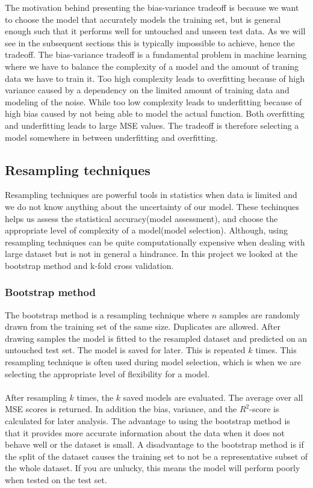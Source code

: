\documentclass[a4paper,twocolumn]{article}
\begin{document}
The motivation behind presenting the bias-variance tradeoff is because we want to choose the model that accurately models the training set, but is general enough such that it performs well for untouched and unseen test data. As we will see in the subsequent sections this is typically impossible to achieve, hence the tradeoff. The bias-variance tradeoff is a fundamental problem in machine learning where we have to balance the complexity of a model and the amount of traning data we have to train it. Too high complexity leads to overfitting because of high variance caused by a dependency on the limited amount of training data and modeling of the noise. While too low complexity leads to underfitting because of high bias caused by not being able to model the actual function. Both overfitting and underfitting leads to large MSE values. The tradeoff is therefore selecting a model somewhere in between underfitting and overfitting.
\subsection{Resampling techniques}
Resampling techniques are powerful tools in statistics when data is limited and we do not know anything about the uncertainty of our model. These techinques helps us assess the statistical accuracy(model assessment), and choose the appropriate level of complexity of a model(model selection). Although, using resampling techniques can be quite computationally expensive when dealing with large dataset but is not in general a hindrance. In this project we looked at the bootstrap method and k-fold cross validation.
\subsubsection{Bootstrap method}
The bootstrap method is a resampling technique where $n$ samples are randomly drawn from the training set of the same size. Duplicates are allowed. After drawing samples the model is fitted to the resampled dataset and predicted on an untouched test set. The model is saved for later. This is repeated $k$ times. This resampling technique is often used during model selection, which is when we are selecting the appropriate level of flexibility for a model.\\
\\
After resampling $k$ times, the $k$ saved models are evaluated. The average over all MSE scores is returned. In addition the bias, variance, and the $R^{2}$-score is calculated for later analysis. The advantage to using the bootstrap method is that it provides more accurate information about the data when it does not behave well or the dataset is small. A disadvantage to the bootstrap method is if the split of the dataset causes the training set to not be a representative subset of the whole dataset. If you are unlucky, this means the model will perform poorly when tested on the test set.
\end{document}
